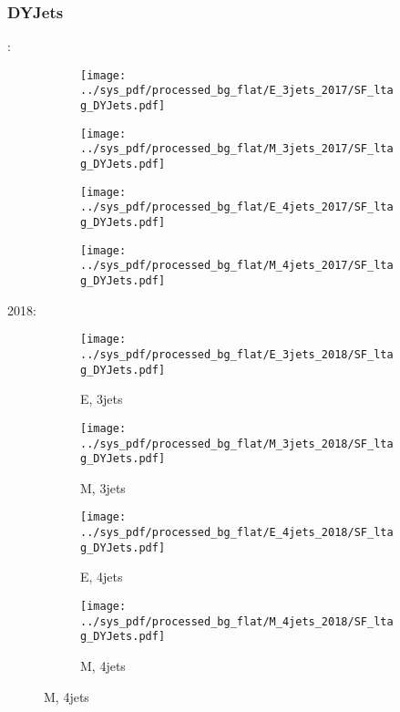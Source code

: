 \documentclass{beamer}
\begin{document}
\begin{frame}
\frametitle{DYJets}
\fontsize{5}{1}:
\begin{figure}
\centering
\begin{subfigure}[b]{0.24\textwidth}
\texttt{[image: ../sys\_pdf/processed\_bg\_flat/E\_3jets\_2017/SF\_ltag\_DYJets.pdf]}
\end{subfigure}
\begin{subfigure}[b]{0.24\textwidth}
\texttt{[image: ../sys\_pdf/processed\_bg\_flat/M\_3jets\_2017/SF\_ltag\_DYJets.pdf]}
\end{subfigure}
\begin{subfigure}[b]{0.24\textwidth}
\texttt{[image: ../sys\_pdf/processed\_bg\_flat/E\_4jets\_2017/SF\_ltag\_DYJets.pdf]}
\end{subfigure}
\begin{subfigure}[b]{0.24\textwidth}
\texttt{[image: ../sys\_pdf/processed\_bg\_flat/M\_4jets\_2017/SF\_ltag\_DYJets.pdf]}
\end{subfigure}
\end{figure}
2018:
\begin{figure}
\centering
\begin{subfigure}[b]{0.24\textwidth}
\texttt{[image: ../sys\_pdf/processed\_bg\_flat/E\_3jets\_2018/SF\_ltag\_DYJets.pdf]}
\captionsetup{font=tiny}
\caption{E, 3jets}
\end{subfigure}
\begin{subfigure}[b]{0.24\textwidth}
\texttt{[image: ../sys\_pdf/processed\_bg\_flat/M\_3jets\_2018/SF\_ltag\_DYJets.pdf]}
\captionsetup{font=tiny}
\caption{M, 3jets}
\end{subfigure}
\begin{subfigure}[b]{0.24\textwidth}
\texttt{[image: ../sys\_pdf/processed\_bg\_flat/E\_4jets\_2018/SF\_ltag\_DYJets.pdf]}
\captionsetup{font=tiny}
\caption{E, 4jets}
\end{subfigure}
\begin{subfigure}[b]{0.24\textwidth}
\texttt{[image: ../sys\_pdf/processed\_bg\_flat/M\_4jets\_2018/SF\_ltag\_DYJets.pdf]}
\captionsetup{font=tiny}
\caption{M, 4jets}
\end{subfigure}
\end{figure}
\end{frame}
\end{document}
